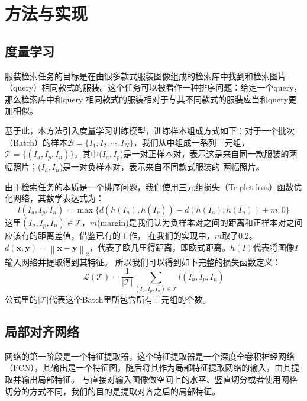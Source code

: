 \section{方法与实现}
\subsection{度量学习}
服装检索任务的目标是在由很多款式服装图像组成的检索库中找到和检索图片（query）相同款式的服装。这个任务可以被看作一种排序问题：给定一个query，那么检索库中和query
相同款式的服装相对于与其不同款式的服装应当和query更加相似。

基于此，本方法引入度量学习训练模型，训练样本组成方式如下：对于一个批次（Batch）的样本${\mathcal{B} = \{I_{1},I_{2},\cdots,I_{N}\}}$，我们从中组成一系列三元组，
${\mathcal{T} = \{(I_{a},I_{p},I_{n})\}}$，其中($I_{a},I_{p}$)是一对正样本对，表示这是来自同一款服装的两幅照片；($I_{a},I_{n}$)是一对负样本对，表示来自不同款式服装的
两幅照片。

由于检索任务的本质是一个排序问题，我们使用三元组损失（Triplet loss）函数优化网络，其数学表达式为：
\begin{equation}
\label{eq:partnet:1}
l(I_{a},I_{p},I_{n}) = \max \{d(h(I_{a}),h(I_{p})) - d(h(I_{a}),h(I_{n})) + m,0\}
\end{equation}
这里$(I_{a},I_{p},I_{n}) \in \mathcal{T}$，$m$(margin)是我们认为负样本对之间的距离和正样本对之间应该有的距离差值，借鉴已有的工作\cite{schroff2015facenet}，
在我们的实现中，$m$取了0.2。$d(\mathbf{x},\mathbf{y})=\left\|{\mathbf{x} - \mathbf{y}}\right\|_{2}$，代表了欧几里得距离，即欧式距离。$h(I)$代表将图像$I$输入网络并提取得到其特征。
所以我们可以得到如下完整的损失函数定义：
\begin{equation}
\label{eq:partnet:2}
\mathcal{L}(\mathcal{T}) = \frac{1}{\left|\mathcal{T}\right|} \sum_{(I_{a},I_{p},I_{n}) \in \mathcal{T}} l(I_{a},I_{p},I_{n})
\end{equation}
公式里的$\left|\mathcal{T}\right|$代表这个Batch里所包含所有三元组的个数。

\subsection{局部对齐网络}
网络的第一阶段是一个特征提取器，这个特征提取器是一个深度全卷积神经网络（FCN），其输出是一个特征图，随后将其作为局部特征提取网络的输入，由其提取并输出局部特征。
与直接对输入图像做空间上的水平、竖直切分或者使用网格切分的方式不同，我们的目的是提取对齐之后的局部特征。

